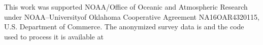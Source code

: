\documentclass{ametsocV6.1}
\begin{document}
\newpage


\clearpage
\acknowledgments
This work was supported NOAA/Office of Oceanic and Atmospheric Research under NOAA–Universityof Oklahoma Cooperative Agreement NA16OAR4320115, U.S.
Department of Commerce.
% 
%
\datastatement
The anonymized survey data is and the code used to process it is available at 









%



\clearpage
\newpage
\appendix[A] 

\label{torn_prone}
\end{document}
